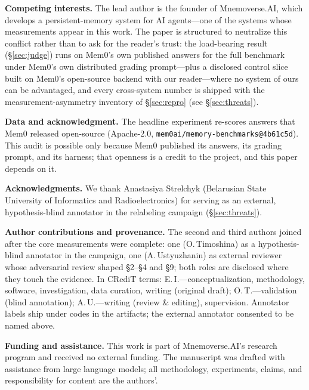 \documentclass[11pt]{article}
\begin{document}
\textbf{Competing interests.} The lead author is the founder of Mnemoverse.AI, which develops a persistent-memory system for AI agents---one of the systems whose measurements appear in this work. The paper is structured to neutralize this conflict rather than to ask for the reader's trust: the load-bearing result (\S\ref{sec:judge}) runs on Mem0's own published answers for the full benchmark under Mem0's own distributed grading prompt---plus a disclosed control slice built on Mem0's open-source backend with our reader---where no system of ours can be advantaged, and every cross-system number is shipped with the measurement-asymmetry inventory of \S\ref{sec:repro} (see \S\ref{sec:threats}).

\textbf{Data and acknowledgment.} The headline experiment re-scores answers that Mem0 released open-source (Apache-2.0, \texttt{mem0ai/memory-benchmarks@4b61c5d}). This audit is possible only because Mem0 published its answers, its grading prompt, and its harness; that openness is a credit to the project, and this paper depends on it.

\textbf{Acknowledgments.} We thank Anastasiya Strelchyk (Belarusian State University of Informatics and Radioelectronics) for serving as an external, hypothesis-blind annotator in the relabeling campaign (\S\ref{sec:threats}).

\textbf{Author contributions and provenance.} The second and third authors joined after the core measurements were complete: one (O.\,Timoshina) as a hypothesis-blind annotator in the campaign, one (A.\,Ustyuzhanin) as external reviewer whose adversarial review shaped \S2--\S4 and \S9; both roles are disclosed where they touch the evidence. In CRediT terms: E.\,I.---conceptualization, methodology, software, investigation, data curation, writing (original draft); O.\,T.---validation (blind annotation); A.\,U.---writing (review \& editing), supervision. Annotator labels ship under codes in the artifacts; the external annotator consented to be named above.

\textbf{Funding and assistance.} This work is part of Mnemoverse.AI's research program and received no external funding. The manuscript was drafted with assistance from large language models; all methodology, experiments, claims, and responsibility for content are the authors'.
\end{document}
